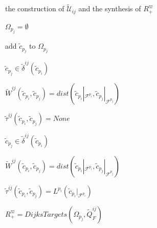 \documentclass[journal]{IEEEtran}
\begin{document}
\begin{algorithm}
  \caption{the construction of $\widetilde{\mathcal{U}}_{ij}$ and the synthesis of $R^{\varpi}_+$}

%
%
%
%
%

  $\Omega_{p_j}=\emptyset$

  {

    {
        add $\tilde{c}_{p_j}$ to $\Omega_{p_j}$
    }
    {
        {
            {
                $\tilde{c}_{p_j}\in \tilde{\delta}^{ij}(\tilde{c}_{p_i})$

                $\widetilde{W}^{ij}(\tilde{c}_{p_i},\tilde{c}_{p_j})=dist(\tilde{c}_{p_i}|_{\mathcal{F}^{p_i}},\tilde{c}_{p_j}|_{\mathcal{F}^{p_j}})$

                $\tilde{\tau}^{ij}(\tilde{c}_{p_i},\tilde{c}_{p_j}) = None$
            }
            \Else
            {
                {
                    $\tilde{c}_{p_j}\in \tilde{\delta}^{ij}(\tilde{c}_{p_i})$

                    $\widetilde{W}^{ij}(\tilde{c}_{p_i},\tilde{c}_{p_j})=dist(\tilde{c}_{p_i}|_{\mathcal{F}^{p_i}},\tilde{c}_{p_j}|_{\mathcal{F}^{p_j}})$

                    $\tilde{\tau}^{ij}(\tilde{c}_{p_i},\tilde{c}_{p_j})=L^{p_i}(\tilde{c}_{p_i}|_{\mathcal{F}^{p_i}})$
                }
            }
        }
    }
  }
  $R^{\varpi}_+=DijksTargets(\Omega_{p_j},\widetilde{Q}^{ij}_F)$


\end{algorithm}
\end{document}
